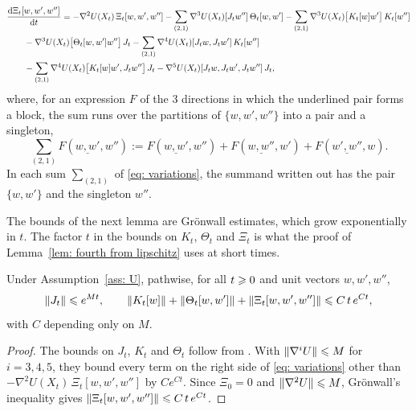 \begin{align}
    & \frac{\mathrm{d} \Xi_t[w,w',w'']}{\mathrm{d} t} = -\nabla^2 U(X_t)\, \Xi_t[w,w',w'']
    - \sum_{(2,1)} \nabla^3 U(X_t)[J_t w'']\, \Theta_t[w,w']
    - \sum_{(2,1)} \nabla^3 U(X_t)\bigl[ K_t[w] w' \bigr]\, K_t[w''] \notag \\
    &\qquad - \nabla^3 U(X_t)\bigl[ \Theta_t[w,w'] w'' \bigr]\, J_t
    - \sum_{(2,1)} \nabla^4 U(X_t)[J_t w, J_t w']\, K_t[w''] \notag \\
    &\qquad - \sum_{(2,1)} \nabla^4 U(X_t)\bigl[ K_t[w] w', J_t w'' \bigr]\, J_t
    - \nabla^5 U(X_t)[J_t w, J_t w', J_t w'']\, J_t ,
    \label{eq: variations}
\end{align}
where, for an expression $F$ of the $3$ directions in which the underlined pair forms a block, the sum runs over the partitions of $\{w,w',w''\}$ into a pair and a singleton,
\begin{equation}
    \sum_{(2,1)} F(\underline{w,w'}, w'') := F(\underline{w,w'}, w'') + F(\underline{w,w''}, w') + F(\underline{w',w''}, w).
    \label{eq: sum21}
\end{equation}
In each sum $\sum_{(2,1)}$ of \eqref{eq: variations}, the summand written out has the pair $\{w,w'\}$ and the singleton $w''$.

The bounds of the next lemma are Gr\"onwall estimates, which grow exponentially in $t$. The factor $t$ in the bounds on $K_t$, $\Theta_t$ and $\Xi_t$ is what the proof of Lemma~\ref{lem: fourth from lipschitz} uses at short times.

\begin{lemma}
\label{lem: variation bounds}
    Under Assumption~\ref{ass: U}, pathwise, for all $t \geqslant 0$ and unit vectors $w, w', w''$,
    \begin{equation}
        \lVert J_t \rVert \leqslant e^{M t} , \qquad
        \lVert K_t[w] \rVert + \lVert \Theta_t[w,w'] \rVert + \lVert \Xi_t[w,w',w''] \rVert \leqslant C\, t\, e^{C t} ,
        \label{eq: variation bounds}
    \end{equation}
    with $C$ depending only on $M$.
\end{lemma}

\begin{proof}
    The bounds on $J_t$, $K_t$ and $\Theta_t$ follow from \citep[Lemma~6]{ye2026mse}. With $\lVert \nabla^i U \rVert \leqslant M$ for $i = 3, 4, 5$, they bound every term on the right side of \eqref{eq: variations} other than $-\nabla^2 U(X_t)\, \Xi_t[w,w',w'']$ by $C e^{Ct}$. Since $\Xi_0 = 0$ and $\lVert \nabla^2 U \rVert \leqslant M$, Gr\"onwall's inequality gives $\lVert \Xi_t[w,w',w''] \rVert \leqslant C\, t\, e^{Ct}$.
\end{proof}

